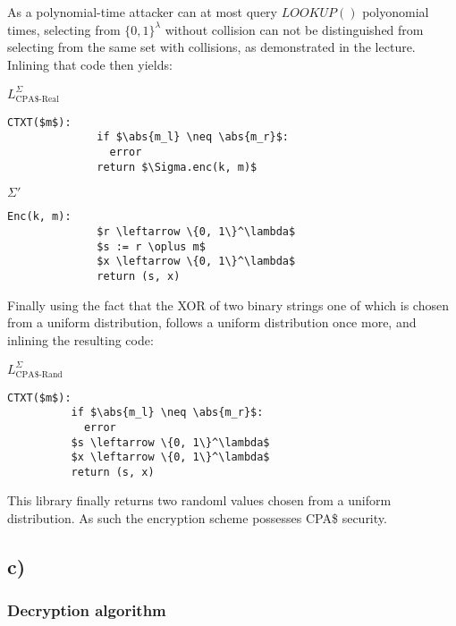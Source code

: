 \documentclass[a4paper]{scrreprt}
\DeclarePairedDelimiter\abs{\lvert}{\rvert}
\begin{document}
As a polynomial-time attacker can at most query $LOOKUP()$ polyonomial times,
selecting from $\{0, 1\}^\lambda$ without collision can not be distinguished
from selecting from the same set with collisions, as demonstrated in the
lecture. Inlining that code then yields:

\begin{tcbraster}[raster columns=2,raster equal height,nobeforeafter,raster column skip=2cm]
	\begin{library}{$L^{\Sigma}_{\text{CPA\$-Real}}$}
		\begin{lstlisting}[mathescape=true,autogobble=true]
			CTXT($m$):
			  if $\abs{m_l} \neq \abs{m_r}$:
			    error
			  return $\Sigma.enc(k, m)$
		\end{lstlisting}
	\end{library}
	\begin{library}{$\Sigma'$}
		\begin{lstlisting}[mathescape=true,autogobble=true]
			Enc(k, m):
			  $r \leftarrow \{0, 1\}^\lambda$
			  $s := r \oplus m$
			  $x \leftarrow \{0, 1\}^\lambda$
			  return (s, x)
		\end{lstlisting}
	\end{library}
\end{tcbraster}

Finally using the fact that the XOR of two binary strings one of which is
chosen from a uniform distribution, follows a uniform distribution once more,
and inlining the resulting code:

\begin{library}{$L^{\Sigma}_{\text{CPA\$-Rand}}$}
	\begin{lstlisting}[mathescape=true,autogobble=true]
		CTXT($m$):
		  if $\abs{m_l} \neq \abs{m_r}$:
		    error
		  $s \leftarrow \{0, 1\}^\lambda$
		  $x \leftarrow \{0, 1\}^\lambda$
		  return (s, x)
	\end{lstlisting}
\end{library}

This library finally returns two randoml values chosen from a uniform
distribution.  As such the encryption scheme possesses CPA\$ security.


\subsection{c)}

\subsubsection{Decryption algorithm}
\end{document}
